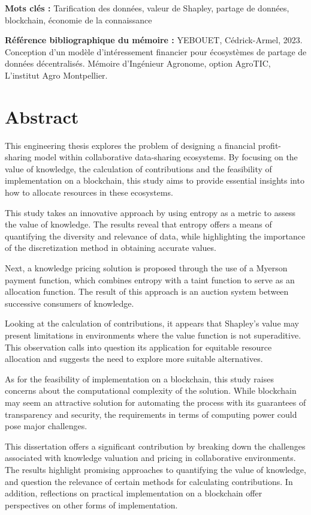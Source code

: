 \textbf{Mots clés :} Tarification des données, valeur de Shapley, partage de données, blockchain, économie de la connaissance

\textbf{Référence bibliographique du mémoire :} YEBOUET, Cédrick-Armel, 2023. Conception d'un modèle d'intéressement financier pour écosystèmes de partage de données décentralisés. Mémoire d’Ingénieur Agronome, option AgroTIC, L'institut Agro Montpellier.

\newpage

\chapter*{Abstract}
\thispagestyle{plain}

This engineering thesis explores the problem of designing a financial profit-sharing model within collaborative data-sharing ecosystems. By focusing on the value of knowledge, the calculation of contributions and the feasibility of implementation on a blockchain, this study aims to provide essential insights into how to allocate resources in these ecosystems.

This study takes an innovative approach by using entropy as a metric to assess the value of knowledge. The results reveal that entropy offers a means of quantifying the diversity and relevance of data, while highlighting the importance of the discretization method in obtaining accurate values.

Next, a knowledge pricing solution is proposed through the use of a Myerson payment function, which combines entropy with a taint function to serve as an allocation function. The result of this approach is an auction system between successive consumers of knowledge.

Looking at the calculation of contributions, it appears that Shapley's value may present limitations in environments where the value function is not superaditive. This observation calls into question its application for equitable resource allocation and suggests the need to explore more suitable alternatives.

As for the feasibility of implementation on a blockchain, this study raises concerns about the computational complexity of the solution. While blockchain may seem an attractive solution for automating the process with its guarantees of transparency and security, the requirements in terms of computing power could pose major challenges.

This dissertation offers a significant contribution by breaking down the challenges associated with knowledge valuation and pricing in collaborative environments. The results highlight promising approaches to quantifying the value of knowledge, and question the relevance of certain methods for calculating contributions. In addition, reflections on practical implementation on a blockchain offer perspectives on other forms of implementation.

